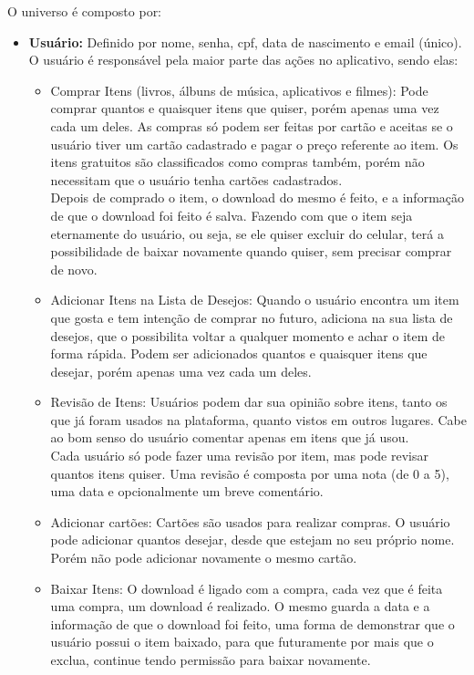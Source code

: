 \documentclass[a4paper, 11pt]{article}
\begin{document}
O universo é composto por:
\begin{itemize}
    \item \textbf{Usuário:} Definido por nome, senha, cpf, data de nascimento e email (único). O usuário é responsável pela maior parte das ações no aplicativo, sendo elas:
    \begin{itemize}
        \item Comprar Itens (livros, álbuns de música, aplicativos e filmes): Pode comprar quantos e quaisquer itens que quiser, porém apenas uma vez cada um deles. As compras só podem ser feitas por cartão e aceitas se o usuário tiver um cartão cadastrado e pagar o preço referente ao item. Os itens gratuitos são classificados como compras também, porém não necessitam que o usuário tenha cartões cadastrados.\\
        Depois de comprado o item, o download do mesmo é feito, e a informação de que o download foi feito é salva. Fazendo com
        que o item seja eternamente do usuário, ou seja, se ele quiser excluir do celular, terá a possibilidade de baixar novamente quando quiser, sem precisar comprar de novo.
        \\
        \item Adicionar Itens na Lista de Desejos: Quando o usuário encontra um item que gosta e tem intenção de comprar no futuro, adiciona na sua lista de desejos, que o possibilita voltar a qualquer momento e achar o item de forma rápida. Podem ser adicionados quantos e quaisquer itens que desejar, porém apenas uma vez cada um deles.
        \\
        \item Revisão de Itens: Usuários podem dar sua opinião sobre itens, tanto os que já foram usados na plataforma, quanto vistos em outros lugares. Cabe ao bom senso do usuário comentar apenas em itens que já usou. \\
        Cada usuário só pode fazer uma revisão por item, mas pode revisar quantos itens quiser. Uma revisão é composta por uma nota (de 0 a 5), uma data e opcionalmente um breve comentário.
        \\
        \item Adicionar cartões: Cartões são usados para realizar compras. O usuário pode adicionar quantos desejar, desde que estejam no seu próprio nome. Porém não pode adicionar novamente o mesmo cartão.
        \\
        \item Baixar Itens: O download é ligado com a compra, cada vez que é feita uma compra, um download é realizado. O mesmo guarda a data e a informação de que o download foi feito, uma forma de demonstrar que o usuário possui o item baixado, para que futuramente por mais que o exclua, continue tendo permissão para baixar novamente.

\end{itemize}
\end{itemize}
\end{document}
